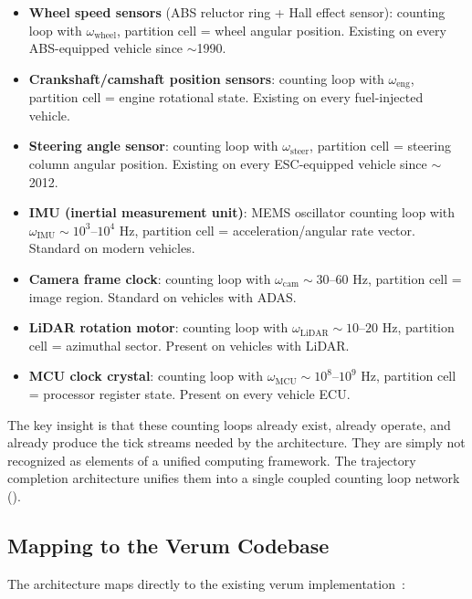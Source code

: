 \documentclass[twocolumn,10pt]{article}
\theoremstyle{definition}
\begin{document}
\begin{itemize}[leftmargin=*]
\item \textbf{Wheel speed sensors} (ABS reluctor ring + Hall effect sensor): counting loop with $\omega_{\mathrm{wheel}}$, partition cell = wheel angular position. Existing on every ABS-equipped vehicle since $\sim$1990.
\item \textbf{Crankshaft/camshaft position sensors}: counting loop with $\omega_{\mathrm{eng}}$, partition cell = engine rotational state. Existing on every fuel-injected vehicle.
\item \textbf{Steering angle sensor}: counting loop with $\omega_{\mathrm{steer}}$, partition cell = steering column angular position. Existing on every ESC-equipped vehicle since $\sim$2012.
\item \textbf{IMU (inertial measurement unit)}: MEMS oscillator counting loop with $\omega_{\mathrm{IMU}} \sim 10^3$--$10^4$ Hz, partition cell = acceleration/angular rate vector. Standard on modern vehicles.
\item \textbf{Camera frame clock}: counting loop with $\omega_{\mathrm{cam}} \sim 30$--$60$ Hz, partition cell = image region. Standard on vehicles with ADAS.
\item \textbf{LiDAR rotation motor}: counting loop with $\omega_{\mathrm{LiDAR}} \sim 10$--$20$ Hz, partition cell = azimuthal sector. Present on vehicles with LiDAR.
\item \textbf{MCU clock crystal}: counting loop with $\omega_{\mathrm{MCU}} \sim 10^8$--$10^9$ Hz, partition cell = processor register state. Present on every vehicle ECU.
\end{itemize}

The key insight is that these counting loops already exist, already operate, and already produce the tick streams needed by the architecture. They are simply not recognized as elements of a unified computing framework. The trajectory completion architecture unifies them into a single coupled counting loop network ().

\subsection{Mapping to the Verum Codebase}

The architecture maps directly to the existing verum implementation~\cite{sachikonye2026buhera,sachikonye2026vahera}:
\end{document}
